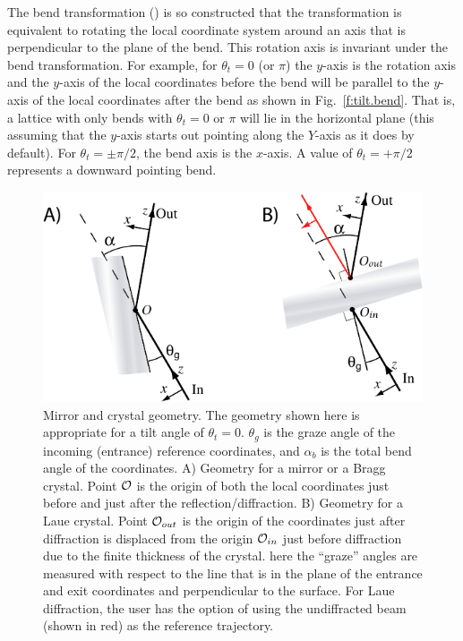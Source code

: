 The bend transformation () is so constructed that the
transformation is equivalent to rotating the local coordinate system
around an axis that is perpendicular to the plane of the bend. This
rotation axis is invariant under the bend transformation. For example,
for $\theta_t = 0$ (or $\pi$) the $y$-axis is the rotation axis and
the $y$-axis of the local coordinates before the bend will be parallel
to the $y$-axis of the local coordinates after the bend as shown in
Fig.~\ref{f:tilt.bend}. That is, a lattice with only bends with
$\theta_t = 0$ or $\pi$ will lie in the horizontal plane (this
assuming that the $y$-axis starts out pointing along the $Y$-axis as
it does by default).  For $\theta_t = \pm\pi/2$, the bend axis is the
$x$-axis. A value of $\theta_t = +\pi/2$ represents a downward
pointing bend.

\begin{figure}
  \centering \includegraphics{mirror.pdf} 
\caption[Mirror and crystal geometry] {Mirror and crystal geometry.
The geometry shown here is appropriate for a tilt angle of $\theta_t =
0$.  $\theta_g$ is the graze angle of the incoming (entrance)
reference coordinates, and $\alpha_b$ is the total bend angle of the
coordinates. A) Geometry for a mirror or a Bragg crystal. Point
${\cal O}$ is the origin of both the local coordinates just before and
just after the reflection/diffraction. B) Geometry for a Laue crystal.
Point ${\cal O}_{out}$ is the origin of the coordinates just after
diffraction is displaced from the origin ${\cal O}_{in}$ just before
diffraction due to the finite thickness of the crystal. here the
``graze'' angles are measured with respect to the line that is in the
plane of the entrance and exit coordinates and perpendicular to the
surface. For Laue diffraction, the user has the option of using the
undiffracted beam (shown in red) as the reference trajectory.
  }  
  \label{f:mirror}
\end{figure}

